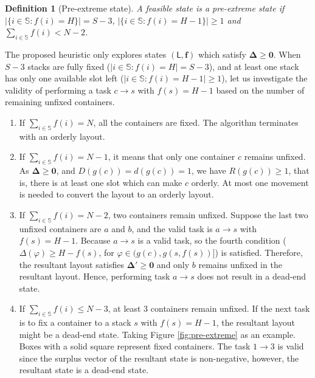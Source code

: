\documentclass[review,3p,times,12pt,number]{elsarticle}\usepackage{amsmath}\usepackage{amssymb}
\newtheorem{definition}{Definition}
\begin{document}
\begin{definition}[Pre-extreme state]
A feasible state is a pre-extreme state if $|\{i\in\mathbb{S}: f(i)=H\}|=S-3$, $|\{i\in\mathbb{S}: f(i)=H-1\}|\ge 1$ and $\sum_{i\in\mathbb{S}}f(i)<N-2$.
\end{definition}

The proposed heuristic only explores states $(\mathsf{L},\boldsymbol{f})$ which satisfy $\boldsymbol{\Delta}\ge \boldsymbol{0}$.
When $S-3$ stacks are fully fixed ($|i \in \mathbb S : f(i)= H| = S- 3$), and at least one stack has only one available slot left ($|i \in \mathbb S : f(i) = H-1| \ge 1$), let us investigate the validity of performing a task $c\rightarrow s$ with $f(s)=H-1$ based on the number of remaining unfixed containers.
\begin{enumerate}
\item If $\sum_{i\in\mathbb{S}} f(i) = N$, all the containers are fixed. The algorithm terminates with an orderly layout.

\item If $\sum_{i\in\mathbb{S}} f(i) = N-1$, it means that only one container $c$ remains unfixed. As $\boldsymbol{\Delta}\ge \boldsymbol {0}$, and $D(g(c))=d(g(c))=1$, we have $R(g(c))\ge1$, that is, there is at least one slot which can make $c$ orderly. At most one movement is needed to convert the layout to an orderly layout.

\item If $\sum_{i\in\mathbb{S}}f(i) = N-2$, two containers remain unfixed. Suppose the last two unfixed containers are $a$ and $b$, and the valid task is $a\rightarrow s$ with $f(s)=H-1$. Because $a\rightarrow s$ is a valid task, so the fourth condition ($\Delta(\varphi)\ge H-f(s)$, for $\varphi\in (g(c),g(s,f(s))]$) is satisfied. Therefore, the resultant layout satisfies $\boldsymbol \Delta' \ge \boldsymbol{0}$ and only $b$ remains unfixed in the resultant layout. Hence, performing task $a\rightarrow s$ does not result in a dead-end state.

\item If $\sum_{i\in\mathbb{S}} f(i)\le N-3$, at least 3 containers remain unfixed. If the next task is to fix a container to a stack $s$ with $f(s)=H-1$, the resultant layout might be a dead-end state. Taking Figure \ref{fig:pre-extreme} as an example. Boxes with a solid square represent fixed containers. The task $1\rightarrow 3$ is valid since the surplus vector of the resultant state is non-negative, however, the resultant state is a dead-end state.
\end{enumerate}
\end{document}
